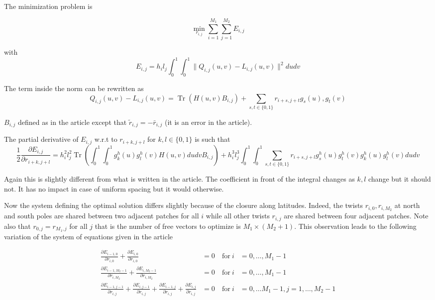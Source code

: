 \documentclass[a4paper, 11pt]{article}
\DeclareMathOperator*{\Tr}{Tr}
\begin{document}
The minimization problem is

\begin{equation*}
  \min_{r_{i,j}} \sum_{i=1}^{M_1} \sum_{j=1}^{M_2} E_{i,j}
\end{equation*}

with \begin{equation*}
  E_{i,j} = h_i l_j \int_0^1 \int_0^1 \| Q_{i,j}(u,v) - L_{i,j}(u,v) \|^2 du dv
\end{equation*}

The term inside the norm can be rewritten as
\begin{equation*}
  Q_{i,j}(u,v) - L_{i,j}(u,v) = \Tr (H(u,v)B_{i,j}) + \sum_{s,t \in \{0, 1\}} r_{i+s, j+t} g_s(u), g_t(v)
\end{equation*}

\begin{remark}{1} 
  $B_{i,j}$ defined as in the article except that $\tilde{r}_{i,j} = -\bar{r}_{i,j}$ (it is an error in the article).  
\end{remark}

The partial derivative of $E_{i,j}$ w.r.t to $r_{i+k, j+l}$ for $k, l \in \{0,1\}$ is such that
\begin{equation*}
  \frac{1}{2} \frac{\partial E_{i,j}}{\partial r_{i+k, j+l}} = h_i^2 l_j^2  \Tr \left( \int_0^1 \int_0^1 g_k^h(u) 
  g_l^h(v) H(u,v) du dv B_{i,j} \right) + h_i^3 l_j^3 \int_0^1 \int_0^1 \sum_{s,t \in \{0,1\}} r_{i+s, j+l} g_s^h(u) 
  g_t^h(v) g_k^h(u)g_l^h(v) du dv
\end{equation*}

\begin{remark}{2}
  Again this is slightly different from what is written in the article. The coefficient in front of the integral changes 
  as $k, l$ change but it should not. It has no impact in case of uniform spacing but it would otherwise.
\end{remark}

Now the system defining the optimal solution differs slightly because of the closure along latitudes. Indeed, the twists 
$r_{i,0}, r_{i, M_2}$ at north and south poles are shared between two adjacent patches for all $i$ while all other 
twists $r_{i,j}$ are shared between four adjacent patches. Note also that $r_{0,j} = r_{M_1, j}$ for all $j$ that is the 
number of free vectors to optimize is $M_1 \times (M_2+1)$. This observation leads to the following variation of the 
system of equations given in the article

\begin{align}
  \frac{\partial E_{i-1, 0}}{\partial r_{i,0}} + \frac{\partial E_{i, 0}}{\partial r_{i,0}} &= 0 & \ \text{for} \ i&=0, 
  \ldots, M_1-1 \label{eq:a} \\
  \frac{\partial E_{i-1, M_2-1}}{\partial r_{i,M_2}} + \frac{\partial E_{i, M_2-1}}{\partial r_{i,M_2}} &= 0 & \ 
  \text{for}\
  i&=0, \ldots, M_1-1 \label{eq:b} \\
  \frac{\partial E_{i-1, j-1}}{\partial r_{i,j}} + \frac{\partial E_{i, j-1}}{\partial r_{i,j}} + \frac{\partial E_{i-1, 
  j}}{\partial r_{i,j}} + \frac{\partial E_{i, j}}{\partial r_{i,j}} &= 0 & \ \text{for} \ i&=0, \ldots M_1 - 1, j=1, 
  \ldots, M_2-1 \label{eq:c}
\end{align}
\end{document}
